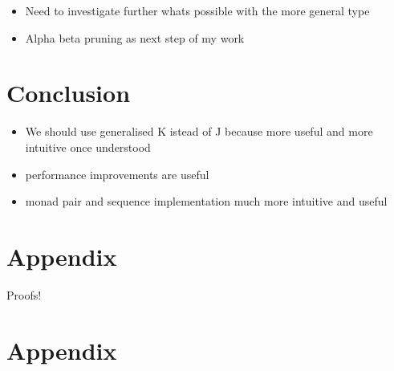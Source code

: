 \documentclass[runningheads]{llncs}
\providecommand{\tightlist}{%
  \setlength{\itemsep}{0pt}\setlength{\parskip}{0pt}}
\begin{document}
\begin{itemize}
\tightlist
\item
  Need to investigate further whats possible with the more general type
\item
  Alpha beta pruning as next step of my work
\end{itemize}

\section{Conclusion}\label{conclusion}

\begin{itemize}
\tightlist
\item
  We should use generalised K istead of J because more useful and more
  intuitive once understood
\item
  performance improvements are useful
\item
  monad pair and sequence implementation much more intuitive and useful
\end{itemize}

\section{Appendix}\label{appendix}

Proofs!\cite{escardo2010sequential}

%
%
%
% 
% 
%



\newpage
\section*{Appendix}
\appendix
\end{document}
